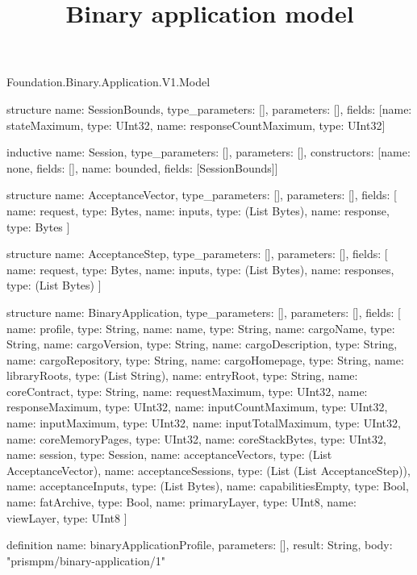 \begin{lexlean}{Foundation.Binary.Application.V1.Model}
\title{Binary application model}
\begin{semanticmodule}
structure{
  name: SessionBounds,
  type_parameters: [],
  parameters: [],
  fields: [{name: stateMaximum, type: UInt32}, {name: responseCountMaximum, type: UInt32}]
}

inductive{
  name: Session,
  type_parameters: [],
  parameters: [],
  constructors: [{name: none, fields: []}, {name: bounded, fields: [SessionBounds]}]
}

structure{
  name: AcceptanceVector,
  type_parameters: [],
  parameters: [],
  fields: [
    {name: request, type: Bytes},
    {name: inputs, type: (List Bytes)},
    {name: response, type: Bytes}
  ]
}

structure{
  name: AcceptanceStep,
  type_parameters: [],
  parameters: [],
  fields: [
    {name: request, type: Bytes},
    {name: inputs, type: (List Bytes)},
    {name: responses, type: (List Bytes)}
  ]
}

structure{
  name: BinaryApplication,
  type_parameters: [],
  parameters: [],
  fields: [
    {name: profile, type: String},
    {name: name, type: String},
    {name: cargoName, type: String},
    {name: cargoVersion, type: String},
    {name: cargoDescription, type: String},
    {name: cargoRepository, type: String},
    {name: cargoHomepage, type: String},
    {name: libraryRoots, type: (List String)},
    {name: entryRoot, type: String},
    {name: coreContract, type: String},
    {name: requestMaximum, type: UInt32},
    {name: responseMaximum, type: UInt32},
    {name: inputCountMaximum, type: UInt32},
    {name: inputMaximum, type: UInt32},
    {name: inputTotalMaximum, type: UInt32},
    {name: coreMemoryPages, type: UInt32},
    {name: coreStackBytes, type: UInt32},
    {name: session, type: Session},
    {name: acceptanceVectors, type: (List AcceptanceVector)},
    {name: acceptanceSessions, type: (List (List AcceptanceStep))},
    {name: acceptanceInputs, type: (List Bytes)},
    {name: capabilitiesEmpty, type: Bool},
    {name: fatArchive, type: Bool},
    {name: primaryLayer, type: UInt8},
    {name: viewLayer, type: UInt8}
  ]
}

definition{
  name: binaryApplicationProfile,
  parameters: [],
  result: String,
  body: "prismpm/binary-application/1"
}
\end{semanticmodule}
\end{lexlean}
